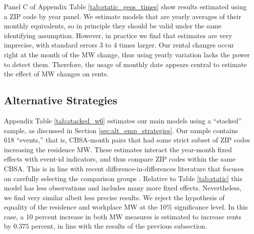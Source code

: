 Panel C of Appendix Table \ref{tab:static_geos_times} show results estimated 
using a ZIP code by year panel.
We estimate models that are yearly averages of their monthly equivalents, 
so in principle they should be valid under the same identifying assumption.
However, in practice we find that estimates are very imprecise, with standard
errors 3 to 4 times larger.
Our rental changes occur right at the month of the MW change, thus using 
yearly variation lacks the power to detect them.
Therefore, the usage of monthly date appears central to estimate the effect
of MW changes on rents.

%


\subsection{Alternative Strategies}
\label{sec:results_alternative_strategies}

Appendix Table \ref{tab:stacked_w6} estimates our main models using a 
``stacked'' sample, as discussed in Section \ref{sec:alt_emp_strategies}.
Our sample contains 618 ``events,'' that is, CBSA-month pairs that had some 
strict subset of ZIP codes increasing the residence MW.
These estimates interact the year-month fixed effects with event-id indicators, 
and thus compare ZIP codes within the same CBSA.
This is in line with recent difference-in-differences literature that 
focuses on carefully selecting the comparison groups 
\parencite{CallawayEtAl2021, deChaisemartinEtAl2022, RothEtAl2022}.
Relative to Table \ref{tab:static} this model has less observations and includes 
many more fixed effects.
Nevertheless, we find very similar albeit less precise results.
We reject the hypothesis of equality of the residence and workplace MW at the
10\% significance level.
In this case, a 10 percent increase in both MW measures is estimated to 
increase rents by $0.375$ percent, in line with the results of the previous 
subsection.

